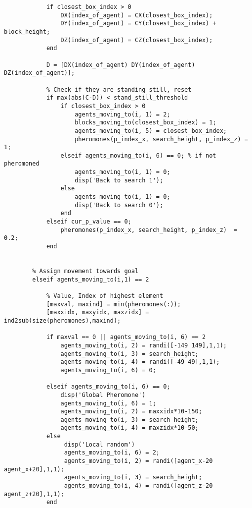 \begin{lstlisting}
            if closest_box_index > 0
                DX(index_of_agent) = CX(closest_box_index);
                DY(index_of_agent) = CY(closest_box_index) + block_height;
                DZ(index_of_agent) = CZ(closest_box_index);
            end
                
            D = [DX(index_of_agent) DY(index_of_agent) DZ(index_of_agent)];
            
            % Check if they are standing still, reset
            if max(abs(C-D)) < stand_still_threshold
                if closest_box_index > 0
                    agents_moving_to(i, 1) = 2;
                    blocks_moving_to(closest_box_index) = 1;
                    agents_moving_to(i, 5) = closest_box_index;
                    pheromones(p_index_x, search_height, p_index_z) = 1;  
                elseif agents_moving_to(i, 6) == 0; % if not pheromoned
                    agents_moving_to(i, 1) = 0;
                    disp('Back to search 1');
                else
                    agents_moving_to(i, 1) = 0;
                    disp('Back to search 0');
                end
            elseif cur_p_value == 0;
                pheromones(p_index_x, search_height, p_index_z)  = 0.2; 
            end
            

        % Assign movement towards goal
        elseif agents_moving_to(i,1) == 2
            
            % Value, Index of highest element
            [maxval, maxind] = min(pheromones(:));
            [maxxidx, maxyidx, maxzidx] = ind2sub(size(pheromones),maxind);

            if maxval == 0 || agents_moving_to(i, 6) == 2
                agents_moving_to(i, 2) = randi([-149 149],1,1);
                agents_moving_to(i, 3) = search_height; 
                agents_moving_to(i, 4) = randi([-49 49],1,1);
                agents_moving_to(i, 6) = 0;
                
            elseif agents_moving_to(i, 6) == 0;
                disp('Global Pheromone')
                agents_moving_to(i, 6) = 1;
                agents_moving_to(i, 2) = maxxidx*10-150;
                agents_moving_to(i, 3) = search_height; 
                agents_moving_to(i, 4) = maxzidx*10-50;
            else 
                 disp('Local random')
                 agents_moving_to(i, 6) = 2;
                 agents_moving_to(i, 2) = randi([agent_x-20 agent_x+20],1,1);
                 agents_moving_to(i, 3) = search_height; 
                 agents_moving_to(i, 4) = randi([agent_z-20 agent_z+20],1,1);
            end
            

\end{lstlisting}
